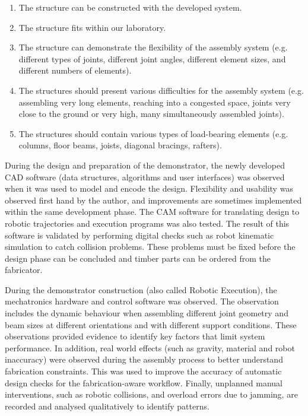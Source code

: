 \begin{enumerate}[nosep]
	\item The structure can be constructed with the developed system.
	\item The structure fits within our laboratory.
	\item The structure can demonstrate the flexibility of the assembly system (e.g. different types of joints, different joint angles, different element sizes, and different numbers of elements).
	\item The structures should present various difficulties for the assembly system (e.g. assembling very long elements, reaching into a congested space, joints very close to the ground or very high, many simultaneously assembled joints).
	\item The structures should contain various types of load-bearing elements (e.g. columns, floor beams, joists, diagonal bracings, rafters).

\end{enumerate}
During the design and preparation of the demonstrator, the newly developed CAD software (data structures, algorithms and user interfaces) was observed when it was used to model and encode the design. Flexibility and usability was observed first hand by the author, and improvements are sometimes implemented within the same development phase. The CAM software for translating design to robotic trajectories and execution programs was also tested. The result of this software is validated by performing digital checks such as robot kinematic simulation to catch collision problems. These problems must be fixed before the design phase can be concluded and timber parts can be ordered from the fabricator. 

During the demonstrator construction (also called Robotic Execution), the mechatronics hardware and control software was observed. The observation includes the dynamic behaviour when assembling different joint geometry and beam sizes at different orientations and with different support conditions. These observations provided evidence to identify key factors that limit system performance.  In addition, real world effects (such as gravity, material and robot inaccuracy) were observed during the assembly process to better understand fabrication constraints. This was used to improve the accuracy of automatic design checks for the fabrication-aware workflow. Finally, unplanned manual interventions, such as robotic collisions, and overload errors due to jamming, are recorded and analysed qualitatively to identify patterns.

